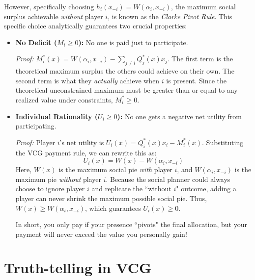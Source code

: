 {\begin{itemize}
  However, specifically choosing $h_i(x_{-i}) = W(\alpha_i, x_{-i})$, the maximum social surplus achievable \textit{without} player $i$, is known as the \textit{Clarke Pivot Rule}. This specific choice analytically guarantees two crucial properties: 
  \begin{itemize}
    \item \textbf{No Deficit ($M_i \ge 0$):} No one is paid just to participate. 
    
    \textit{Proof:} $M_i^*(x) = W(\alpha_i, x_{-i}) - \sum_{j\neq i} Q_j^*(x)x_j$. The first term is the theoretical maximum surplus the others could achieve on their own. The second term is what they \textit{actually} achieve when $i$ is present. Since the theoretical unconstrained maximum must be greater than or equal to any realized value under constraints, $M_i^* \ge 0$.
    
    \item \textbf{Individual Rationality ($U_i \ge 0$):} No one gets a negative net utility from participating. 
    
    \textit{Proof:} Player $i$'s net utility is $U_i(x) = Q_i^*(x)x_i - M_i^*(x)$. Substituting the VCG payment rule, we can rewrite this as:
    \[
    U_i(x) = W(x) - W(\alpha_i, x_{-i})
    \]
    Here, $W(x)$ is the maximum social pie \textit{with} player $i$, and $W(\alpha_i, x_{-i})$ is the maximum pie \textit{without} player $i$. Because the social planner could always choose to ignore player $i$ and replicate the ``without $i$" outcome, adding a player can never shrink the maximum possible social pie. Thus, $W(x) \ge W(\alpha_i, x_{-i})$, which guarantees $U_i(x) \ge 0$. 
    
    In short, you only pay if your presence ``pivots" the final allocation, but your payment will never exceed the value you personally gain!
  \end{itemize}
\end{itemize}
}

\section{Truth-telling in VCG}

